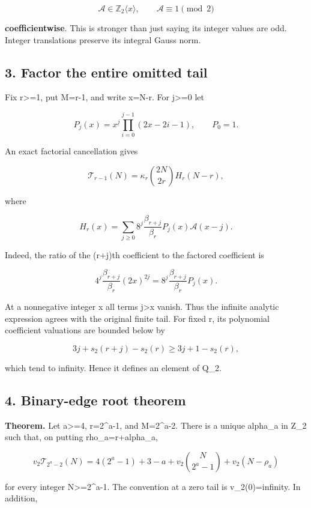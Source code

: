 \documentclass[11pt,letterpaper]{article}
\begin{document}
\[
\mathscr A\in\mathbb Z_2\langle x\rangle,\qquad
\mathscr A\equiv1\pmod2
\]

\textbf{coefficientwise}. This is stronger than just saying its integer values are odd. Integer translations preserve its integral Gauss norm.

\subsection{3. Factor the entire omitted tail}\label{factor-the-entire-omitted-tail}

Fix r\textgreater=1, put M=r-1, and write x=N-r. For j\textgreater=0 let

\[
P_j(x)=x^{\underline j}\prod_{i=0}^{j-1}(2x-2i-1),\qquad P_0=1.
\]

An exact factorial cancellation gives

\[
\mathcal T_{r-1}(N)=\kappa_r\binom{2N}{2r}H_r(N-r),
\]

where

\[
H_r(x)=\sum_{j\ge0}8^j\frac{\beta_{r+j}}{\beta_r}P_j(x)\mathscr A(x-j).
\]

Indeed, the ratio of the (r+j)th coefficient to the factored coefficient is

\[
4^j\frac{\beta_{r+j}}{\beta_r}(2x)^{\underline{2j}}
=8^j\frac{\beta_{r+j}}{\beta_r}P_j(x).
\]

At a nonnegative integer x all terms j\textgreater x vanish. Thus the infinite analytic expression agrees with the original finite tail. For fixed r, its polynomial coefficient valuations are bounded below by

\[
3j+s_2(r+j)-s_2(r)\ge3j+1-s_2(r),
\]

which tend to infinity. Hence it defines an element of Q\_2.

\subsection{4. Binary-edge root theorem}\label{binary-edge-root-theorem}

\textbf{Theorem.} Let a\textgreater=4, r=2\^{}a-1, and M=2\^{}a-2. There is a unique alpha\_a in Z\_2 such that, on putting rho\_a=r+alpha\_a,

\[
\boxed{
 v_2\mathcal T_{2^a-2}(N)
 =4(2^a-1)+3-a+v_2\binom{N}{2^a-1}+v_2(N-\rho_a)
}
\]

for every integer N\textgreater=2\^{}a-1. The convention at a zero tail is v\_2(0)=infinity. In addition,
\end{document}
